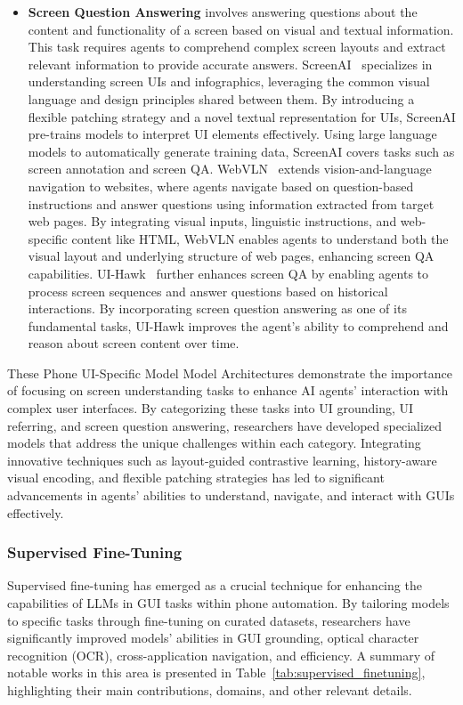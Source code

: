 \begin{itemize}
\item \textbf{Screen Question Answering}
involves answering questions about the content and functionality of a screen based on visual and textual information. This task requires agents to comprehend complex screen layouts and extract relevant information to provide accurate answers.
ScreenAI~\cite{baechler2024screenai} specializes in understanding screen UIs and infographics, leveraging the common visual language and design principles shared between them. By introducing a flexible patching strategy and a novel textual representation for UIs, ScreenAI pre-trains models to interpret UI elements effectively. Using large language models to automatically generate training data, ScreenAI covers tasks such as screen annotation and screen QA.
WebVLN~\cite{chen2024webvln} extends vision-and-language navigation to websites, where agents navigate based on question-based instructions and answer questions using information extracted from target web pages. By integrating visual inputs, linguistic instructions, and web-specific content like HTML, WebVLN enables agents to understand both the visual layout and underlying structure of web pages, enhancing screen QA capabilities.
UI-Hawk~\cite{zhang2024ui-hawk} further enhances screen QA by enabling agents to process screen sequences and answer questions based on historical interactions. By incorporating screen question answering as one of its fundamental tasks, UI-Hawk improves the agent's ability to comprehend and reason about screen content over time.
\end{itemize} 


These Phone UI-Specific Model Model Architectures demonstrate the importance of focusing on screen understanding tasks to enhance AI agents' interaction with complex user interfaces. By categorizing these tasks into UI grounding, UI referring, and screen question answering, researchers have developed specialized models that address the unique challenges within each category. Integrating innovative techniques such as layout-guided contrastive learning, history-aware visual encoding, and flexible patching strategies has led to significant advancements in agents' abilities to understand, navigate, and interact with GUIs effectively.

\subsubsection{Supervised Fine-Tuning}
\label{subsubsec:sft}


Supervised fine-tuning has emerged as a crucial technique for enhancing the capabilities of LLMs in GUI tasks within phone automation. By tailoring models to specific tasks through fine-tuning on curated datasets, researchers have significantly improved models' abilities in GUI grounding, optical character recognition (OCR), cross-application navigation, and efficiency. A summary of notable works in this area is presented in Table~\ref{tab:supervised_finetuning}, highlighting their main contributions, domains, and other relevant details.

